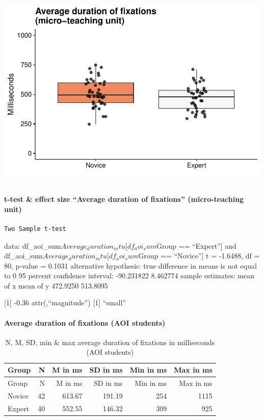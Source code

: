 \documentclass[
]{article}
\begin{document}
\includegraphics{expertise_2024_09_26_no_outlierdetection_MK_files/figure-latex/dur_all-1.pdf}

\paragraph{t-test \& effect size ``Average duration of fixations''
(micro-teaching
unit)}\label{t-test-effect-size-average-duration-of-fixations-micro-teaching-unit}

\begin{verbatim}
Two Sample t-test
\end{verbatim}

data: df\_aoi\_sum\(Average_duration_mtu[df_aoi_sum\)Group ==
``Expert''{]} and df\_aoi\_sum\(Average_duration_mtu[df_aoi_sum\)Group
== ``Novice''{]} t = -1.6488, df = 80, p-value = 0.1031 alternative
hypothesis: true difference in means is not equal to 0 95 percent
confidence interval: -90.231822 8.462774 sample estimates: mean of x
mean of y 472.9250 513.8095

{[}1{]} -0.36 attr(,``magnitude'') {[}1{]} ``small''

\paragraph{Average duration of fixations (AOI
students)}\label{average-duration-of-fixations-aoi-students}

\begin{longtable}[]{@{}lrrrrr@{}}
\caption{N, M, SD, min \& max average duration of fixations in
milliseconds (AOI students)}\tabularnewline
\toprule\noalign{}
Group & N & M in ms & SD in ms & Min in ms & Max in ms \\
\midrule\noalign{}
\endfirsthead
\toprule\noalign{}
Group & N & M in ms & SD in ms & Min in ms & Max in ms \\
\midrule\noalign{}
\endhead
\bottomrule\noalign{}
\endlastfoot
Novice & 42 & 613.67 & 191.19 & 254 & 1115 \\
Expert & 40 & 552.55 & 146.32 & 309 & 925 \\
\end{longtable}
\end{document}
